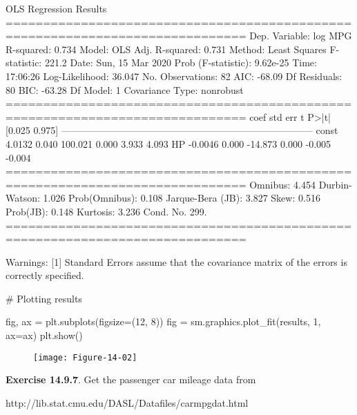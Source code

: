 \begin{console}
                            OLS Regression Results
==============================================================================
Dep. Variable:                log MPG   R-squared:                       0.734
Model:                            OLS   Adj. R-squared:                  0.731
Method:                 Least Squares   F-statistic:                     221.2
Date:                Sun, 15 Mar 2020   Prob (F-statistic):           9.62e-25
Time:                        17:06:26   Log-Likelihood:                 36.047
No. Observations:                  82   AIC:                            -68.09
Df Residuals:                      80   BIC:                            -63.28
Df Model:                           1
Covariance Type:            nonrobust
==============================================================================
                 coef    std err          t      P>|t|      [0.025      0.975]
------------------------------------------------------------------------------
const          4.0132      0.040    100.021      0.000       3.933       4.093
HP            -0.0046      0.000    -14.873      0.000      -0.005      -0.004
==============================================================================
Omnibus:                        4.454   Durbin-Watson:                   1.026
Prob(Omnibus):                  0.108   Jarque-Bera (JB):                3.827
Skew:                           0.516   Prob(JB):                        0.148
Kurtosis:                       3.236   Cond. No.                         299.
==============================================================================

Warnings:
[1] Standard Errors assume that the covariance matrix of the errors is correctly
specified.
\end{console}

\begin{python}
# Plotting results

fig, ax = plt.subplots(figsize=(12, 8))
fig = sm.graphics.plot_fit(results, 1, ax=ax)
plt.show()
\end{python}

\begin{figure}[H]
\texttt{[image: Figure-14-02]}
\end{figure}

\textbf{Exercise 14.9.7}. Get the passenger car mileage data from

http://lib.stat.cmu.edu/DASL/Datafiles/carmpgdat.html


